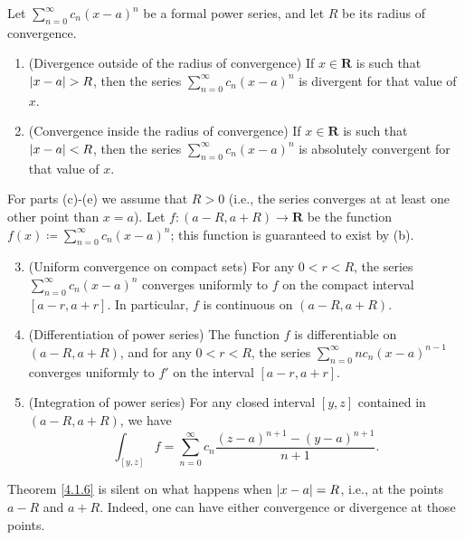 \setcounter{theorem}{5}
\begin{theorem}\label{4.1.6}
    Let \(\sum_{n = 0}^\infty c_n (x - a)^n\) be a formal power series, and let \(R\) be its radius of convergence.
    \begin{enumerate}
        \item (Divergence outside of the radius of convergence)
              If \(x \in \mathbf{R}\) is such that \(\abs*{x - a} > R\), then the series \(\sum_{n = 0}^\infty c_n (x - a)^n\) is divergent for that value of \(x\).
        \item (Convergence inside the radius of convergence)
              If \(x \in \mathbf{R}\) is such that \(\abs*{x - a} < R\), then the series \(\sum_{n = 0}^\infty c_n (x - a)^n\) is absolutely convergent for that value of \(x\).
    \end{enumerate}
    For parts (c)-(e) we assume that \(R > 0\)
    (i.e., the series converges at at least one other point than \(x = a\)).
    Let \(f : (a - R, a + R) \to \mathbf{R}\) be the function \(f(x) \coloneqq \sum_{n = 0}^\infty c_n (x - a)^n\);
    this function is guaranteed to exist by (b).
    \begin{enumerate}
        \setcounter{enumi}{2}
        \item (Uniform convergence on compact sets)
              For any \(0 < r < R\), the series \(\sum_{n = 0}^\infty c_n (x - a)^n\) converges uniformly to \(f\) on the compact interval \([a - r, a + r]\).
              In particular, \(f\) is continuous on \((a - R, a + R)\).
        \item (Differentiation of power series)
              The function \(f\) is differentiable on \((a - R, a + R)\), and for any \(0 < r < R\), the series \(\sum_{n = 0}^\infty n c_n (x - a)^{n - 1}\) converges uniformly to \(f'\) on the interval \([a - r, a + r]\).
        \item (Integration of power series)
              For any closed interval \([y, z]\) contained in \((a - R, a + R)\), we have
              \[
                  \int_{[y, z]} f = \sum_{n = 0}^\infty c_n \frac{(z - a)^{n + 1} - (y - a)^{n + 1}}{n + 1}.
              \]
    \end{enumerate}
\end{theorem}

\setcounter{theorem}{7}
\begin{remark}\label{4.1.8}
    Theorem \ref{4.1.6} is silent on what happens when \(\abs*{x - a} = R\), i.e., at the points \(a - R\) and \(a + R\).
    Indeed, one can have either convergence or divergence at those points.
\end{remark}

